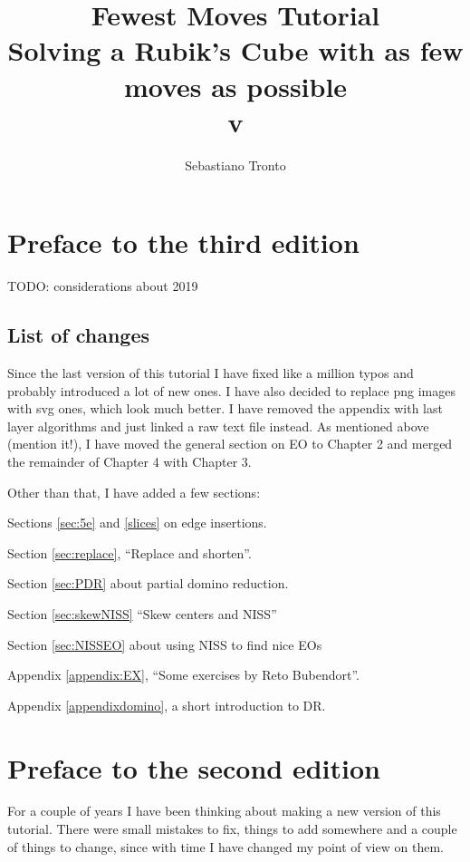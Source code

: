 \documentclass[11pt,a4paper]{book}
\author{Sebastiano Tronto}
\title{Fewest Moves Tutorial\\
\large Solving a Rubik's Cube with as few moves as possible\\
\small v\version}
\begin{document}
\maketitle

\section*{Preface to the third edition}

{\color{red}TODO: considerations about 2019}

\subsection*{List of changes}

Since the last version of this tutorial I have fixed like a million typos and probably introduced a lot of new ones. I have also decided to replace png images with svg ones, which look much better. I have removed the appendix with last layer algorithms and just linked a raw text file instead. As mentioned above ({\color{red}mention it!}), I have moved the general section on EO to Chapter 2 and merged the remainder of Chapter 4 with Chapter 3.

Other than that, I have added a few sections:
\begin{itemize}
\item Sections \ref{sec:5e} and \ref{slices} on edge insertions.
\item Section \ref{sec:replace}, ``Replace and shorten''.
\item Section \ref{sec:PDR} about partial domino reduction.
{\color{red}\item Section \ref{sec:skewNISS} ``Skew centers and NISS''
\item Section \ref{sec:NISSEO} about using NISS to find nice EOs}
\item Appendix \ref{appendix:EX}, ``Some exercises by Reto Bubendort''.
\item Appendix \ref{appendixdomino}, a short introduction to DR.
\end{itemize}

\newpage



\section*{Preface to the second edition}

For a couple of years I have been thinking about making a new version of this tutorial. There were small mistakes to fix, things to add somewhere and a couple of things to change, since with time I have changed my point of view on them.
\end{document}
